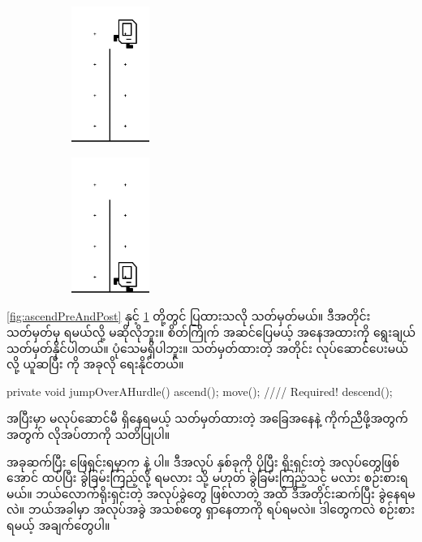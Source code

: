 \begin{sloppypar}
\begin{figure}[!htb]
  \caption{ }
  \begin{subfigure}[t]{0.3\textwidth}
    \includegraphics[width=1in, left]{ch03/HurdleJumping/descendPre}
    \caption{}
  \end{subfigure}
  \begin{subfigure}[t]{0.3\textwidth}
      \includegraphics[width=1in, left]{ch03/HurdleJumping/descendPost}
      \caption{}
  \end{subfigure}
  \label{fig:descendPreAndPost}
\end{figure}
\Fig \ref*{fig:ascendPreAndPost}   နှင့် \ref*{fig:descendPreAndPost} တို့တွင် ပြထားသလို သတ်မှတ်မယ်။ ဒီအတိုင်းသတ်မှတ်မှ ရမယ်လို့ မဆိုလိုဘူး။ စိတ်ကြိုက် အဆင်ပြေမယ့် အနေအထားကို ရွေးချယ် သတ်မှတ်နိုင်ပါတယ်။ ပုံသေမရှိပါဘူး။ သတ်မှတ်ထားတဲ့ အတိုင်း လုပ်ဆောင်ပေးမယ်လို့ ယူဆပြီး  ကို အခုလို ရေးနိုင်တယ်။ 
\begin{lstcodeminimal}
private void jumpOverAHurdle(){
        ascend(); 
        move(); //// Required!
        descend();
}
\end{lstcodeminimal}
 အပြီးမှာ  မလုပ်ဆောင်မီ ရှိနေရမယ့် သတ်မှတ်ထားတဲ့ အခြေအနေနဲ့ ကိုက်ညီဖို့အတွက် အတွက်   \mmcommand လိုအပ်တာကို သတိပြုပါ။ 

အခုဆက်ပြီး ဖြေရှင်းရမှာက  နဲ့  ပါ။ ဒီအလုပ် နှစ်ခုကို ပိုပြီး ရိုးရှင်းတဲ့ အလုပ်တွေဖြစ်အောင် ထပ်ပြီး ခွဲခြမ်းကြည့်လို့ ရမလား သို့ မဟုတ် ခွဲခြမ်းကြည့်သင့် မလား  စဉ်းစားရမယ်။ ဘယ်လောက်ရိုးရှင်းတဲ့ အလုပ်ခွဲတွေ ဖြစ်လာတဲ့ အထိ ဒီအတိုင်းဆက်ပြီး ခွဲနေရမလဲ။ ဘယ်အခါမှာ အလုပ်အခွဲ အသစ်တွေ ရှာနေတာကို ရပ်ရမလဲ။ ဒါ‌တွေကလဲ စဉ်းစား ရမယ့် အချက်တွေပါ။ 


\end{sloppypar}
